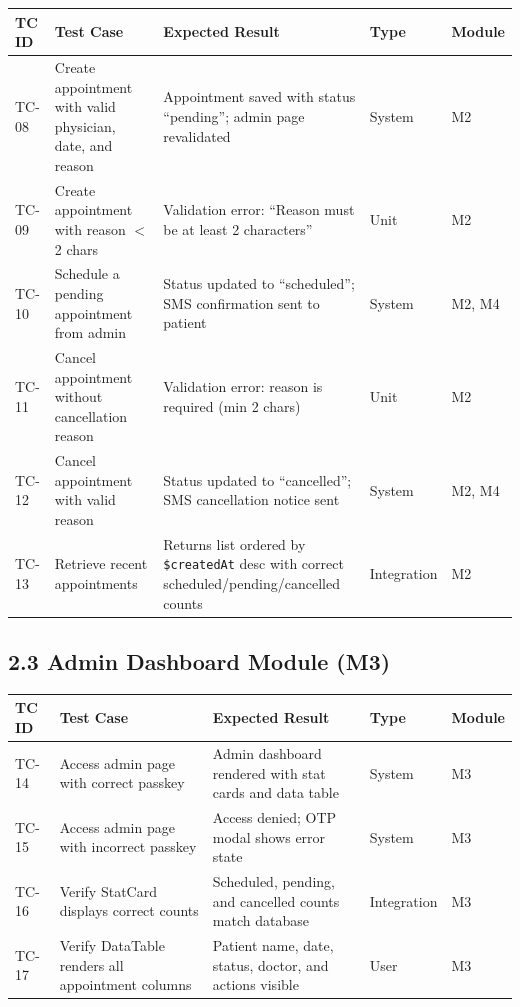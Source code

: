 \documentclass[12pt,a4paper]{article}
\begin{document}
\begin{longtable}{@{}p{1.2cm}p{3.5cm}p{4.5cm}p{2.5cm}p{1.5cm}@{}}
\toprule
\textbf{TC ID} & \textbf{Test Case} & \textbf{Expected Result} & \textbf{Type} & \textbf{Module} \\
\midrule
\endfirsthead

TC-08 & Create appointment with valid physician, date, and reason & Appointment saved with status ``pending''; admin page revalidated & System & M2 \\
\midrule
TC-09 & Create appointment with reason $<$ 2 chars & Validation error: ``Reason must be at least 2 characters'' & Unit & M2 \\
\midrule
TC-10 & Schedule a pending appointment from admin & Status updated to ``scheduled''; SMS confirmation sent to patient & System & M2, M4 \\
\midrule
TC-11 & Cancel appointment without cancellation reason & Validation error: reason is required (min 2 chars) & Unit & M2 \\
\midrule
TC-12 & Cancel appointment with valid reason & Status updated to ``cancelled''; SMS cancellation notice sent & System & M2, M4 \\
\midrule
TC-13 & Retrieve recent appointments & Returns list ordered by \texttt{\$createdAt} desc with correct scheduled/pending/cancelled counts & Integration & M2 \\
\bottomrule
\end{longtable}

\subsection{2.3 Admin Dashboard Module (M3)}

\begin{longtable}{@{}p{1.2cm}p{3.5cm}p{4.5cm}p{2.5cm}p{1.5cm}@{}}
\toprule
\textbf{TC ID} & \textbf{Test Case} & \textbf{Expected Result} & \textbf{Type} & \textbf{Module} \\
\midrule
\endfirsthead

TC-14 & Access admin page with correct passkey & Admin dashboard rendered with stat cards and data table & System & M3 \\
\midrule
TC-15 & Access admin page with incorrect passkey & Access denied; OTP modal shows error state & System & M3 \\
\midrule
TC-16 & Verify StatCard displays correct counts & Scheduled, pending, and cancelled counts match database & Integration & M3 \\
\midrule
TC-17 & Verify DataTable renders all appointment columns & Patient name, date, status, doctor, and actions visible & User & M3 \\
\bottomrule
\end{longtable}
\end{document}
